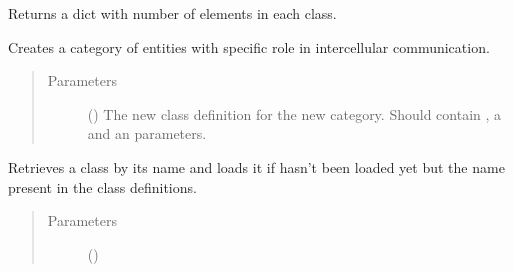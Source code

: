 \documentclass[letterpaper,10pt,english]{sphinxmanual}
\begin{document}
\begin{fulllineitems}

\begin{fulllineitems}
\label{\detokenize{reference:pypath.annot.CustomAnnotation.counts}}
Returns a dict with number of elements in each class.

\end{fulllineitems}


\begin{fulllineitems}
\label{\detokenize{reference:pypath.annot.CustomAnnotation.create_class}}
Creates a category of entities with specific role in
intercellular communication.
\begin{quote}\begin{description}
\item[{Parameters}] \leavevmode
{} () \textendash{} The new class definition for the new category. Should
contain , a  and an 
parameters.

\end{description}\end{quote}

\end{fulllineitems}


\begin{fulllineitems}
\label{\detokenize{reference:pypath.annot.CustomAnnotation.export}}
\end{fulllineitems}


\begin{fulllineitems}
\label{\detokenize{reference:pypath.annot.CustomAnnotation.get_class}}
Retrieves a class by its name and loads it if hasn’t been loaded yet
but the name present in the class definitions.
\begin{quote}\begin{description}
\item[{Parameters}] \leavevmode
{} () \textendash{} 


\end{description}
\end{quote}
\end{fulllineitems}
\end{fulllineitems}
\end{document}
